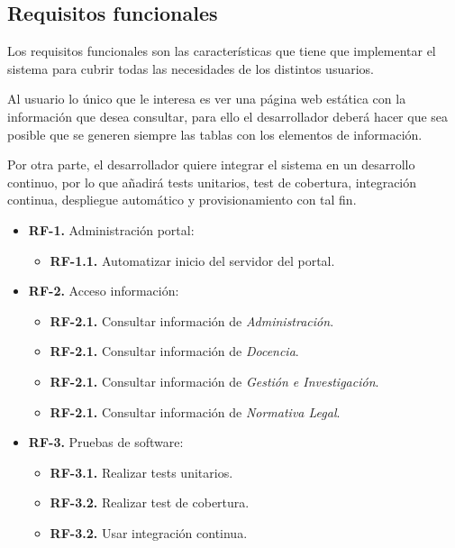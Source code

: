 \subsection{Requisitos funcionales}

Los requisitos funcionales son las características que tiene que implementar el sistema para cubrir todas las necesidades de los distintos usuarios.

\bigskip
Al usuario lo único que le interesa es ver una página web estática con la información que desea 
consultar, para ello el desarrollador deberá hacer que sea posible que se generen siempre las tablas con los elementos de información. 

\bigskip
Por otra parte, el desarrollador quiere integrar el sistema en un desarrollo continuo, por lo que añadirá tests unitarios, test de cobertura, integración continua, despliegue automático y provisionamiento con tal fin.

\begin{itemize}
  \item \textbf{RF-1.} Administración portal:
    \begin{itemize}
    \item \textbf{RF-1.1.} Automatizar inicio del servidor del portal.
    \end{itemize}
\end{itemize}

\begin{itemize}
  \item \textbf{RF-2.} Acceso información:
    \begin{itemize}
    \item \textbf{RF-2.1.} Consultar información de \textit{Administración}.
    \item \textbf{RF-2.1.} Consultar información de \textit{Docencia}.
    \item \textbf{RF-2.1.} Consultar información de \textit{Gestión e Investigación}.
    \item \textbf{RF-2.1.} Consultar información de \textit{Normativa Legal}.
    \end{itemize}
\end{itemize}

\begin{itemize}
  \item \textbf{RF-3.} Pruebas de software:
  \begin{itemize}
    \item \textbf{RF-3.1.} Realizar tests unitarios.
    \item \textbf{RF-3.2.} Realizar test de cobertura.
    \item \textbf{RF-3.2.} Usar integración continua.
    \end{itemize}
\end{itemize}

